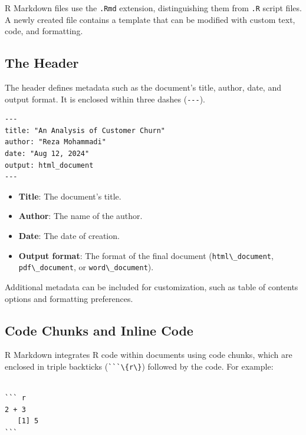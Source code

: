 \documentclass[
]{book}
\newcommand{\passthrough}[1]{#1}
\providecommand{\tightlist}{%
  \setlength{\itemsep}{0pt}\setlength{\parskip}{0pt}}
\theoremstyle{definition}
\theoremstyle{definition}
\theoremstyle{definition}
\theoremstyle{definition}
\theoremstyle{remark}
\begin{document}
R Markdown files use the \passthrough{\lstinline!.Rmd!} extension, distinguishing them from \passthrough{\lstinline!.R!} script files. A newly created file contains a template that can be modified with custom text, code, and formatting.

\subsection*{The Header}\label{the-header}

The header defines metadata such as the document's title, author, date, and output format. It is enclosed within three dashes (\passthrough{\lstinline!---!}).

\begin{lstlisting}
---
title: "An Analysis of Customer Churn"
author: "Reza Mohammadi"
date: "Aug 12, 2024"
output: html_document
---
\end{lstlisting}

\begin{itemize}
\tightlist
\item
  \textbf{Title}: The document's title.\\
\item
  \textbf{Author}: The name of the author.\\
\item
  \textbf{Date}: The date of creation.\\
\item
  \textbf{Output format}: The format of the final document (\passthrough{\lstinline!html\_document!}, \passthrough{\lstinline!pdf\_document!}, or \passthrough{\lstinline!word\_document!}).
\end{itemize}

Additional metadata can be included for customization, such as table of contents options and formatting preferences.

\subsection*{Code Chunks and Inline Code}\label{code-chunks-and-inline-code}

R Markdown integrates R code within documents using code chunks, which are enclosed in triple backticks (\passthrough{\lstinline!```\{r\}!}) followed by the code. For example:

\begin{lstlisting}

``` r
2 + 3
   [1] 5
```
\end{lstlisting}
\end{document}
